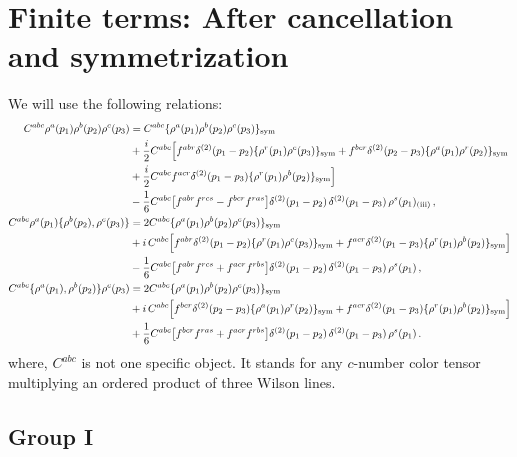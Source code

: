 \documentclass[9pt]{article}
\numberwithin{equation}{section}
\begin{document}
\section{Finite terms: After cancellation and symmetrization}\label{sec:D}
We will use the following relations: 
\begin{align}
C^{abc}\rho^{a}(p_{1})\rho^{b}(p_{2})\rho^{c}(p_{3})&=C^{abc}\{\rho^{a}(p_{1})\rho^{b}(p_{2})\rho^{c}(p_{3})\}_{\rm sym}\notag\\
&+\frac{i}{2}C^{abc}\Big[f^{abr}\delta^{(2)}(p_{1}-p_{2})\{\rho^{r}(p_{1})\rho^{c}(p_{3})\}_{\rm sym}+f^{bcr}\delta^{(2)}(p_{2}-p_{3})\{\rho^{a}(p_{1})\rho^{r}(p_{2})\}_{\rm sym}\notag\\
&+\frac{i}{2}C^{abc}f^{acr}\delta^{(2)}(p_{1}-p_{3})\{\rho^{r}(p_{1})\rho^{b}(p_{2})\}_{\rm sym}\Big]\notag\\
&-\frac{1}{6}C^{abc}\big[f^{abr}f^{rcs}-f^{bcr}f^{ras}\big]\delta^{(2)}(p_{1}-p_{2})\,\delta^{(2)}(p_{1}-p_{3})\,\rho^{s}(p_{1})_{\rm (iii)}\,,\label{eq:D-ord}\\
C^{abc}\rho^{a}(p_{1})\{\rho^{b}(p_{2}),\rho^{c}(p_{3})\}&=2C^{abc}\{\rho^{a}(p_{1})\rho^{b}(p_{2})\rho^{c}(p_{3})\}_{\rm sym}\notag\\
&+i\,C^{abc}\Big[f^{abr}\delta^{(2)}(p_{1}-p_{2})\{\rho^{r}(p_{1})\rho^{c}(p_{3})\}_{\rm sym}+f^{acr}\delta^{(2)}(p_{1}-p_{3})\{\rho^{r}(p_{1})\rho^{b}(p_{2})\}_{\rm sym}\Big]\notag\\
&-\frac{1}{6}C^{abc}\big[f^{abr}f^{rcs}+f^{acr}f^{rbs}\big]\delta^{(2)}(p_{1}-p_{2})\,\delta^{(2)}(p_{1}-p_{3})\,\rho^{s}(p_{1})\,,\label{eq:D-r12}\\
C^{abc}\{\rho^{a}(p_{1}),\rho^{b}(p_{2})\}\rho^{c}(p_{3})&=2C^{abc}\{\rho^{a}(p_{1})\rho^{b}(p_{2})\rho^{c}(p_{3})\}_{\rm sym}\notag\\
&+i\,C^{abc}\Big[f^{bcr}\delta^{(2)}(p_{2}-p_{3})\{\rho^{a}(p_{1})\rho^{r}(p_{2})\}_{\rm sym}+f^{acr}\delta^{(2)}(p_{1}-p_{3})\{\rho^{r}(p_{1})\rho^{b}(p_{2})\}_{\rm sym}\Big]\notag\\
&+\frac{1}{6}C^{abc}\big[f^{bcr}f^{ras}+f^{acr}f^{rbs}\big]\delta^{(2)}(p_{1}-p_{2})\,\delta^{(2)}(p_{1}-p_{3})\,\rho^{s}(p_{1})\,.\label{eq:D-r21}
\end{align}
where, $C^{abc}$ is not one specific object. It stands for any $c$-number color tensor multiplying an ordered product of three Wilson lines. 

\subsection{Group I}
\end{document}
